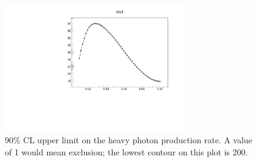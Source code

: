 \begin{figure}[ht]
\begin{center}
    \includegraphics[width=0.7\textwidth,page=4,angle=-90]{vertexing/figs/golden_mres_output}
\end{center}
    \caption{90\% CL upper limit on the heavy photon production rate. A value of 1 would mean exclusion; the lowest contour on this plot is 200.}
    \label{fig:upper_limit}
\end{figure}
